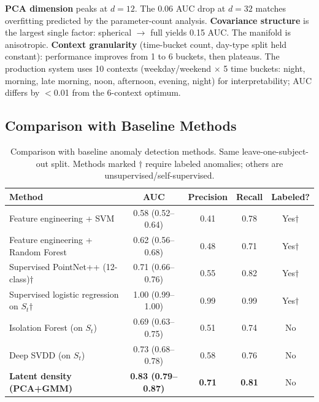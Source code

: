 \documentclass[11pt,a4paper]{article}
\begin{document}
\textbf{PCA dimension} peaks at $d{=}12$. The 0.06 AUC drop at $d{=}32$ matches overfitting predicted by the parameter-count analysis.
\textbf{Covariance structure} is the largest single factor: spherical $\to$ full yields 0.15 AUC. The manifold is anisotropic.
\textbf{Context granularity} (time-bucket count, day-type split held constant): performance improves from 1 to 6 buckets, then plateaus. The production system uses 10 contexts (weekday/weekend $\times$ 5 time buckets: night, morning, late morning, noon, afternoon, evening, night) for interpretability; AUC differs by $<$0.01 from the 6-context optimum.

\subsection{Comparison with Baseline Methods}

\begin{table}[H]
\centering
\caption{Comparison with baseline anomaly detection methods. Same leave-one-subject-out split. Methods marked $\dagger$ require labeled anomalies; others are unsupervised/self-supervised.}
\label{tab:baselines}
\begin{tabular}{lcccc}
\toprule
\textbf{Method} & \textbf{AUC} & \textbf{Precision} & \textbf{Recall} & \textbf{Labeled?} \\
\midrule
Feature engineering + SVM        & 0.58 (0.52--0.64) & 0.41 & 0.78 & Yes$\dagger$ \\
Feature engineering + Random Forest & 0.62 (0.56--0.68) & 0.48 & 0.71 & Yes$\dagger$ \\
Supervised PointNet++ (12-class)$\dagger$ & 0.71 (0.66--0.76) & 0.55 & 0.82 & Yes$\dagger$ \\
Supervised logistic regression on $S_t$$\dagger$ & 1.00 (0.99--1.00) & 0.99 & 0.99 & Yes$\dagger$ \\
Isolation Forest (on $S_t$) & 0.69 (0.63--0.75) & 0.51 & 0.74 & No \\
Deep SVDD (on $S_t$)        & 0.73 (0.68--0.78) & 0.58 & 0.76 & No \\
\textbf{Latent density (PCA+GMM)} & \textbf{0.83 (0.79--0.87)} & \textbf{0.71} & \textbf{0.81} & No \\
\bottomrule
\end{tabular}
\end{table}
\end{document}
